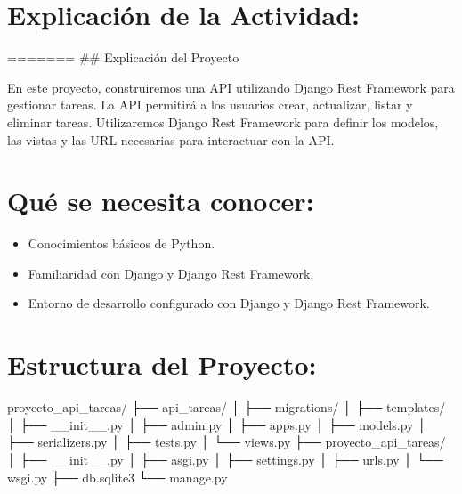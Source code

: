\documentclass[
  a4paper,
  DIV=11,
  numbers=noendperiod,
  onepage,
  openany]{scrreprt}
\newenvironment{Shaded}{\begin{snugshade}}{\end{snugshade}}
\newcommand{\NormalTok}[1]{\textcolor[rgb]{0.00,0.23,0.31}{#1}}
\providecommand{\tightlist}{%
  \setlength{\itemsep}{0pt}\setlength{\parskip}{0pt}}\usepackage{longtable,booktabs,array}
\begin{document}
\hypertarget{explicaciuxf3n-de-la-actividad-84}{%
\section{Explicación de la
Actividad:}\label{explicaciuxf3n-de-la-actividad-84}}

======= \#\# Explicación del Proyecto

En este proyecto, construiremos una API utilizando Django Rest Framework
para gestionar tareas. La API permitirá a los usuarios crear,
actualizar, listar y eliminar tareas. Utilizaremos Django Rest Framework
para definir los modelos, las vistas y las URL necesarias para
interactuar con la API.

\hypertarget{quuxe9-se-necesita-conocer-1}{%
\section{Qué se necesita conocer:}\label{quuxe9-se-necesita-conocer-1}}

\begin{itemize}
\tightlist
\item
  Conocimientos básicos de Python.
\item
  Familiaridad con Django y Django Rest Framework.
\item
  Entorno de desarrollo configurado con Django y Django Rest Framework.
\end{itemize}

\hypertarget{estructura-del-proyecto-1}{%
\section{Estructura del Proyecto:}\label{estructura-del-proyecto-1}}

\begin{Shaded}
\begin{Highlighting}[]
\NormalTok{proyecto\_api\_tareas/}
\NormalTok{├── api\_tareas/}
\NormalTok{│   ├── migrations/}
\NormalTok{│   ├── templates/}
\NormalTok{│   ├── \_\_init\_\_.py}
\NormalTok{│   ├── admin.py}
\NormalTok{│   ├── apps.py}
\NormalTok{│   ├── models.py}
\NormalTok{│   ├── serializers.py}
\NormalTok{│   ├── tests.py}
\NormalTok{│   └── views.py}
\NormalTok{├── proyecto\_api\_tareas/}
\NormalTok{│   ├── \_\_init\_\_.py}
\NormalTok{│   ├── asgi.py}
\NormalTok{│   ├── settings.py}
\NormalTok{│   ├── urls.py}
\NormalTok{│   └── wsgi.py}
\NormalTok{├── db.sqlite3}
\NormalTok{└── manage.py}
\end{Highlighting}
\end{Shaded}
\end{document}
